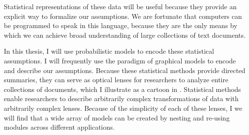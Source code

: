 Statistical representations of these data will be useful because they
provide an explicit way to formalize our assumptions.  We are
fortunate that computers can be programmed to speak in this language,
because they are the only means by which we can achieve broad
understanding of large collections of text documents.

In this thesis, I will use probabilistic models to encode these
statistical assumptions.  I will frequently use the paradigm of
graphical models \citep{pearl:1985} to encode and describe our
assumptions.  Because these statistical methods provide directed
summaries, they can serve as optical lenses for researchers to analyze
entire collections of documents, which I illustrate as a cartoon in
.  Statistical methods enable researchers to
describe arbitrarily complex transformations of data with arbitrarily
complex lenses.  Because of the simplicity of each of these lenses, I
we will find that a wide array of models can be created by nesting and
re-using modules across different applications.

